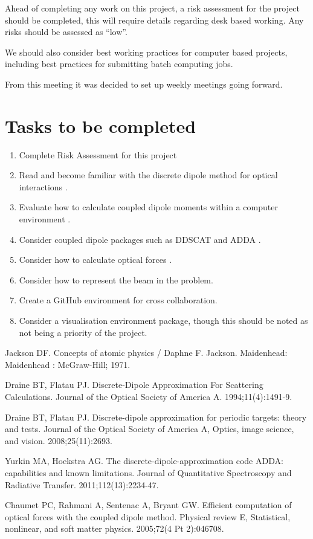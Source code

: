 \documentclass[11pt]{meetingmins}
\begin{document}
Ahead of completing any work on this project, a risk assessment for the project should be completed, this will require details regarding desk based working. Any risks should be assessed as ``low''.

We should also consider best working practices for computer based projects, including best practices for submitting batch computing jobs.

From this meeting it was decided to set up weekly meetings going forward.

\section{Tasks to be completed}
\begin{enumerate}
\item Complete Risk Assessment for this project
\item Read and become familiar with the discrete dipole method for optical interactions \cite{Ref1}.
\item Evaluate how to calculate coupled dipole moments within a computer environment \cite{Ref2}.
\item Consider coupled dipole packages such as DDSCAT \cite{Ref3} and ADDA \cite{Ref4}.
\item Consider how to calculate optical forces \cite{Ref5}.
\item Consider how to represent the beam in the problem.
\item Create a GitHub environment for cross collaboration.
\item Consider a visualisation environment package, though this should be noted as not being a priority of the project.
\end{enumerate}

\vspace{1em}


\begin{thebibliography}{99}

	Jackson DF. Concepts of atomic physics / Daphne F. Jackson. Maidenhead: Maidenhead : McGraw-Hill; 1971.

	Draine BT, Flatau PJ. Discrete-Dipole Approximation For Scattering Calculations. Journal of the Optical Society of America A. 1994;11(4):1491-9.
	
	Draine BT, Flatau PJ. Discrete-dipole approximation for periodic targets: theory and tests. Journal of the Optical Society of America A, Optics, image science, and vision. 2008;25(11):2693.
	
	Yurkin MA, Hoekstra AG. The discrete-dipole-approximation code ADDA: capabilities and known limitations. Journal of Quantitative Spectroscopy and Radiative Transfer. 2011;112(13):2234-47.
	
	Chaumet PC, Rahmani A, Sentenac A, Bryant GW. Efficient computation of optical forces with the coupled dipole method. Physical review E, Statistical, nonlinear, and soft matter physics. 2005;72(4 Pt 2):046708.

\end{thebibliography}
\end{document}
